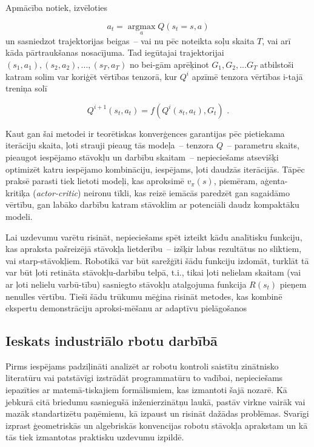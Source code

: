 \documentclass[12pt, a4paper]{article}
\numberwithin{equation}{section} %
\begin{document}
Apmācība notiek, izvēloties

\begin{equation}
    a_t = \operatorname*{argmax}_a Q(s_t = s, a)
\end{equation}
un sasniedzot trajektorijas beigas~-- vai nu pēc noteikta soļu skaita $T$, vai arī kāda pārtraukšanas nosacījuma. Tad iegūtajai trajektorijai $(s_1, a_1), (s_2, a_2), ..., (s_T, a_T)$ no bei-gām aprēķinot $G_1, G_2, ... G_T$ atbilstoši katram solim var koriģēt vērtības tenzorā, kur $Q^i$ apzīmē tenzora vērtības i-tajā treniņa solī

\begin{equation}
    Q^{i+1}(s_t,a_t)=f(Q^{i}(s_t, a_t), G_t)
\text{ .}
\end{equation}

Kaut gan šai metodei ir teorētiskas konverģences garantijas pēc pietiekama iterāciju skaita, ļoti strauji pieaug tās modeļa~-- tenzora $Q$~-- parametru skaits, pieaugot iespējamo stāvokļu un darbību skaitam~-- nepieciešams atsevišķi optimizēt katru iespējamo kombināciju, iespējams, ļoti daudzās iterācijās. Tāpēc praksē parasti tiek lietoti modeļi, kas aproksimē $v_{\pi}(s)$, piemēram, aģenta-kritiķa (\textit{actor-critic}) neironu tīkli, kas reizē iemācās paredzēt gan sagaidāmo vērtību, gan labāko darbību katram stāvoklim ar potenciāli daudz kompaktāku modeli.

Lai uzdevumu varētu risināt, nepieciešams spēt izteikt kādu analītisku funkciju, kas apraksta pašreizējā stāvokļa lietderību~-- izšķir labus rezultātus no sliktiem, vai starp-stāvokļiem. Robotikā var būt sarežģīti šādu funkciju izdomāt, turklāt tā var būt ļoti retināta stāvokļu-darbību telpā, t.i., tikai ļoti nelielam skaitam (vai ar ļoti nelielu varbū-tību) sasniegto stāvokļu atalgojuma funkcija $R(s_t)$ pieņem nenulles vērtību. Tieši šādu trūkumu mēģina risināt metodes, kas kombinē ekspertu demonstrāciju aproksi-mēšanu ar adaptīvu pielāgošanos \cite{nair2018overcoming}


\subsection{Ieskats industriālo rbotu darbībā}

Pirms iespējams padziļināti analizēt ar robotu kontroli saistītu zinātnisko literatūru vai patstāvīgi izstrādāt programmatūru to vadībai, nepieciešams iepazīties ar matemā-tiskajiem formālismiem, kas izmantoti šajā nozarē. Kā jebkurā citā briedumu sasniegušā inženierzinātņu laukā, pastāv virkne vairāk vai mazāk standartizētu paņēmienu, kā izpaust un risināt dažādas problēmas. Svarīgi izprast ģeometriskās un algebriskās konvencijas robotu stāvokļa aprakstam un kā tās tiek izmantotas praktisku uzdevumu izpildē.
\end{document}
